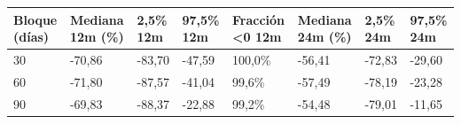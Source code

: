 \begin{tabular}{llllllll}
\toprule
Bloque (días) & Mediana 12m (\%) & 2,5\% 12m & 97,5\% 12m & Fracción <0 12m & Mediana 24m (\%) & 2,5\% 24m & 97,5\% 24m \\
\midrule
30 & -70,86 & -83,70 & -47,59 & 100,0\% & -56,41 & -72,83 & -29,60 \\
60 & -71,80 & -87,57 & -41,04 & 99,6\% & -57,49 & -78,19 & -23,28 \\
90 & -69,83 & -88,37 & -22,88 & 99,2\% & -54,48 & -79,01 & -11,65 \\
\bottomrule
\end{tabular}
